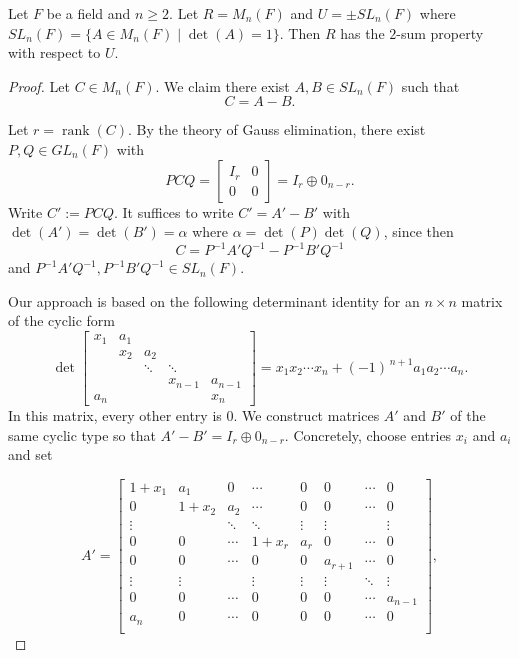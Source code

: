 \documentclass[10pt,a4paper]{amsart}
\begin{document}
\begin{prop}
Let $F$ be a field and $n \geq 2.$ Let $R=M_n(F)$ and $U= \pm SL_n(F)$ where $SL_n(F)=\{A \in M_n(F) \mid \det(A)=1\}.$ Then $R$ has the $2$-sum property with respect to $U.$
\end{prop}

\begin{proof}
Let \(C\in M_n(F)\). We claim there exist \(A,B\in SL_n(F)\) such that
\[
C=A-B.
\]

Let \(r=\operatorname{rank}(C)\). By the theory of Gauss elimination, there exist \(P,Q\in GL_n(F)\) with
\[
PCQ=\begin{bmatrix}I_r & 0\\[4pt]0 & 0\end{bmatrix}=I_r\oplus 0_{n-r}.
\]
Write \(C':=PCQ\). It suffices to write \(C'=A'-B'\) with \(\det(A')=\det(B')= \alpha\) where $\alpha = \det(P) \det(Q)$, since then
\[
C=P^{-1}A'Q^{-1}-P^{-1}B'Q^{-1}
\]
and \(P^{-1}A'Q^{-1},P^{-1}B'Q^{-1}\in SL_n(F)\).

Our approach is based on the following determinant identity for an \(n\times n\) matrix of the cyclic form
\[
\det\begin{bmatrix}
x_1 & a_1 &  &  &  \\
 & x_2 & a_2 &  &  \\
 &  & \ddots & \ddots & \\
 &  &  & x_{n-1} & a_{n-1} \\
a_n &  &  &  & x_n
\end{bmatrix}
= x_1x_2\cdots x_n + (-1)^{\,n+1}a_1a_2\cdots a_n.
\]
In this matrix, every other entry is $0.$ We construct matrices \(A'\) and \(B'\) of the same cyclic type so that \(A'-B'=I_r\oplus 0_{n-r}\). Concretely, choose entries \(x_i\) and \(a_i\) and set



\[
A'=
\begin{bmatrix}
1+x_1 & a_1 & 0 & \cdots & 0 & 0 & \cdots & 0\\
0 & 1+x_2 & a_2 & \cdots & 0 & 0 & \cdots & 0\\
\vdots & & \ddots & \ddots & \vdots & \vdots & & \vdots\\
0 & 0 & \cdots & 1+x_r & a_r & 0 & \cdots & 0\\
0 & 0 & \cdots & 0 & 0 & a_{r+1} & \cdots & 0\\
\vdots & \vdots & & \vdots & \vdots & \vdots & \ddots & \vdots\\
0 & 0 & \cdots & 0 & 0 & 0 & \cdots  & a_{n-1} \\
a_n & 0 & \cdots & 0 & 0 & 0 & \cdots  & 0 \\
\end{bmatrix},
\]


\end{proof}
\end{document}
